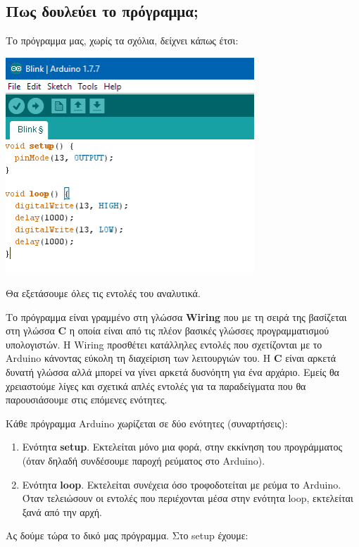 \documentclass[a4paper,twoside,12pt]{article}
\begin{document}
\subsection{Πως δουλεύει το πρόγραμμα;}
Το πρόγραμμα μας, χωρίς τα σχόλια, δείχνει κάπως έτσι:

\begin{center}
  \includegraphics[width=0.7\textwidth]{images/main/first-program}
\end{center}

Θα εξετάσουμε όλες τις εντολές του αναλυτικά.

Το πρόγραμμα είναι γραμμένο στη γλώσσα \textbf{Wiring} που με τη σειρά της βασίζεται στη γλώσσα \textbf{C} η οποία είναι από τις πλέον βασικές γλώσσες προγραμματισμού υπολογιστών. Η Wiring προσθέτει κατάλληλες εντολές που σχετίζονται με το Arduino κάνοντας εύκολη τη διαχείριση των λειτουργιών του. Η \textbf{C} είναι αρκετά δυνατή γλώσσα αλλά μπορεί να γίνει αρκετά δυσνόητη για ένα αρχάριο. Εμείς θα χρειαστούμε λίγες και σχετικά απλές εντολές για τα παραδείγματα που θα παρουσιάσουμε στις επόμενες ενότητες.

Κάθε πρόγραμμα Arduino χωρίζεται σε δύο ενότητες (συναρτήσεις):

\begin{enumerate}
\item Ενότητα \textbf{setup}. Εκτελείται μόνο μια φορά, στην εκκίνηση του προγράμματος (όταν δηλαδή συνδέσουμε παροχή ρεύματος στο Arduino).
\item Ενότητα \textbf{loop}. Εκτελείται συνέχεια όσο τροφοδοτείται με ρεύμα το Arduino. Όταν τελειώσουν οι εντολές που περιέχονται μέσα στην ενότητα loop, εκτελείται ξανά από την αρχή.
\end{enumerate}

Ας δούμε τώρα το δικό μας πρόγραμμα. Στο setup έχουμε:
\end{document}
